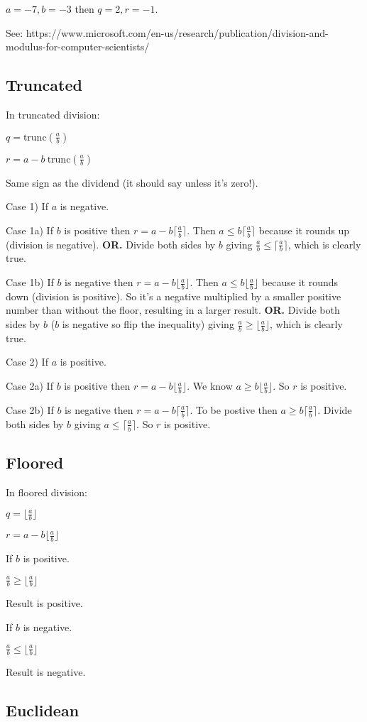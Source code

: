 $a = -7, b = -3$ then $q = 2, r = -1$.

See: https://www.microsoft.com/en-us/research/publication/division-and-modulus-for-computer-scientists/

\subsection{Truncated}

In truncated division:

$q = \textrm{trunc}(\frac{a}{b})$

$r = a - b\ \textrm{trunc}(\frac{a}{b})$

Same sign as the dividend (it should say unless it's zero!).

Case 1)
If $a$ is negative.

Case 1a)
If $b$ is positive then $r = a - b \lceil \frac{a}{b} \rceil$.
Then $a \leq b \lceil \frac{a}{b} \rceil$ because it rounds up (division is
negative).
\textbf{OR.}
Divide both sides by $b$ giving $\frac{a}{b} \leq \lceil \frac{a}{b} \rceil$,
which is clearly true.

Case 1b)
If $b$ is negative then $r = a - b \lfloor \frac{a}{b} \rfloor$.
Then $a \leq b \lfloor \frac{a}{b} \rfloor$ because it rounds down (division is
positive).
So it's a negative multiplied by a smaller positive number than without the
floor, resulting in a larger result.
\textbf{OR.}
Divide both sides by $b$ ($b$ is negative so flip the inequality) giving
$\frac{a}{b} \geq \lfloor \frac{a}{b} \rfloor$, which is clearly true.

Case 2)
If $a$ is positive.

Case 2a)
If $b$ is positive then $r = a - b \lfloor \frac{a}{b} \rfloor$.
We know $a \geq b \lfloor \frac{a}{b} \rfloor$.
So $r$ is positive.

Case 2b)
If $b$ is negative then $r = a - b \lceil \frac{a}{b} \rceil$.
To be postive then $a \geq b \lceil \frac{a}{b} \rceil$.
Divide both sides by $b$ giving $a \leq \lceil \frac{a}{b} \rceil$.
So $r$ is positive.

\subsection{Floored}

In floored division:

$q = \lfloor \frac{a}{b} \rfloor$

$r = a - b \lfloor \frac{a}{b} \rfloor$

If $b$ is positive.

$\frac{a}{b} \geq \lfloor \frac{a}{b} \rfloor$

Result is positive.

If $b$ is negative.

$\frac{a}{b} \leq \lfloor \frac{a}{b} \rfloor$

Result is negative.

\subsection{Euclidean}

